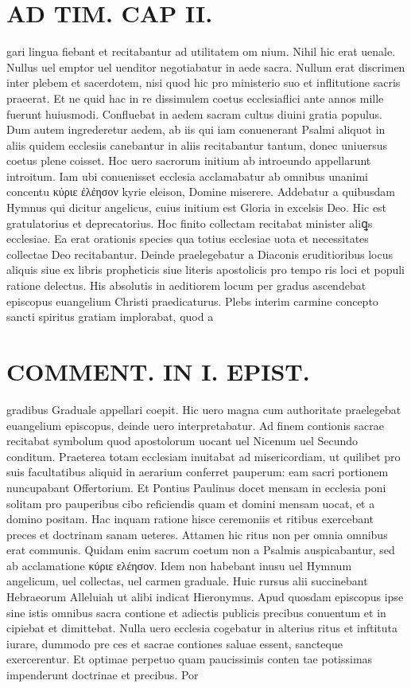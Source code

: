 \documentclass{article}
\begin{document}
\begin{pages}
\section*{AD TIM. CAP II. }
\marginpar{[ p.108 ]}\pstart gari lingua fiebant et recitabantur ad utilitatem om nium. Nihil hic erat uenale. Nullus uel emptor uel uenditor negotiabatur in aede sacra. Nullum erat discrimen inter plebem et sacerdotem, nisi quod hic pro ministerio suo et inflitutione sacris praeerat. Et ne quid hac in re dissimulem coetus ecclesiaflici ante annos mille fuerunt huiusmodi. Confluebat in aedem sacram cultus diuini gratia populus. Dum autem ingrederetur aedem, ab iis qui iam conuenerant Psalmi aliquot in aliis quidem ecclesiis canebantur in aliis recitabantur tantum, donec uniuersus coetus plene coisset. Hoc uero sacrorum initium ab introeundo appellarunt introitum. Iam ubi conuenisset ecclesia acclamabatur ab omnibus unanimi concentu κύριε ἐλέησον kyrie eleison, Domine miserere. Addebatur a quibusdam Hymnus qui dicitur angelicus, cuius initium est Gloria in excelsis Deo. Hic est gratulatorius et deprecatorius. Hoc finito collectam recitabat minister aliꝗs ecclesiae. Ea erat orationis species qua totius ecclesiae uota et necessitates collectae Deo recitabantur. Deinde praelegebatur a Diaconis eruditioribus locus aliquis siue ex libris propheticis siue literis apostolicis pro tempo ris loci et populi ratione delectus. His absolutis in aeditiorem locum per gradus ascendebat episcopus euangelium Christi praedicaturus. Plebs interim carmine concepto sancti spiritus gratiam implorabat, quod a  \pend
\section*{COMMENT. IN I. EPIST. }\pstart gradibus Graduale appellari coepit. Hic uero magna cum authoritate praelegebat euangelium episcopus, deinde uero interpretabatur. Ad finem contionis sacrae recitabat symbolum quod apostolorum uocant uel Nicenum uel Secundo conditum. Praeterea totam ecclesiam inuitabat ad misericordiam, ut quilibet pro suis facultatibus aliquid in aerarium conferret pauperum: eam sacri portionem nuncupabant Offertorium. Et Pontius Paulinus docet mensam in ecclesia poni solitam pro pauperibus cibo reficiendis quam et domini mensam uocat, et a domino positam. Hac inquam ratione hisce ceremoniis et ritibus exercebant preces et doctrinam sanam ueteres. Attamen hic ritus non per omnia omnibus erat communis. Quidam enim sacrum coetum non a Psalmis auspicabantur, sed ab acclamatione κύριε ελέησον. Idem non habebant inusu uel Hymnum angelicum, uel collectas, uel carmen graduale. Huic rursus alii succinebant Hebraeorum Alleluiah ut alibi indicat Hieronymus. Apud quosdam episcopus ipse sine istis omnibus sacra contione et adiectis publicis precibus conuentum et in cipiebat et dimittebat. Nulla uero ecclesia cogebatur in alterius ritus et inftituta iurare, dummodo pre ces et sacrae contiones saluae essent, sancteque exercerentur. Et optimae perpetuo quam paucissimis conten tae potissimas impenderunt doctrinae et precibus. Por  \pend

\end{pages}
\end{document}
